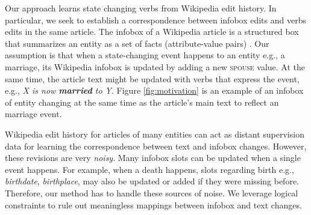   

Our approach learns state changing verbs from Wikipedia edit history. In particular, we seek to establish a correspondence between infobox edits and verbs edits in the same article. The infobox of a  Wikipedia article is  a structured box that summarizes an entity as a set of facts (attribute-value pairs) . Our assumption is that when a state-changing event happens to an entity e.g., a marriage, its Wikipedia infobox is  updated by adding a new \textsc{spouse} value. 
At the same time, the article text  might be updated with verbs that express the event, e.g., \textit{X is now \textbf{married} to Y}.  Figure \ref{fig:motivation} is an example of an infobox of entity changing at the same time as the article's main text to reflect an marriage event.

Wikipedia edit history for  articles of many entities can act as distant supervision  data for learning the correspondence between text and infobox changes. However, these revisions are very  \textit{noisy}.  Many infobox slots can be  updated when a single event happens.
For example, when a death happens, slots regarding birth e.g., \textit{birthdate}, \textit{birthplace}, may also be updated or added if they were missing before.
Therefore, our method has to handle these sources of noise.  We leverage logical constraints  to rule out meaningless mappings  between infobox and text changes. 

